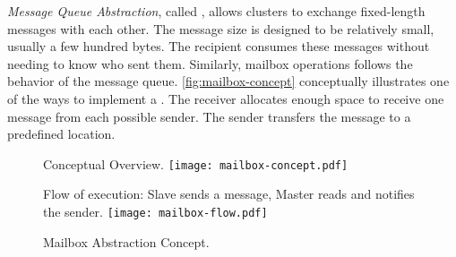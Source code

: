 
			\textit{Message Queue Abstraction}, called \mailbox, allows clusters to exchange
			fixed-length messages with each other. The message size is designed to be
			relatively small, usually a few hundred bytes. The recipient consumes these
			messages without needing to know who sent them. Similarly, mailbox operations
			follows the behavior of the \posix message queue. \autoref{fig:mailbox-concept}
			conceptually illustrates one of the ways to implement a \mailbox. The receiver
			allocates enough space to receive one message from each possible sender.
			The sender transfers the message to a predefined location.

			\begin{figure}[!tb]
				\centering%
				\caption{Mailbox Abstraction Concept.}%
				\label{fig:mailbox}%

					{Conceptual Overview.}%
					{\texttt{[image: mailbox-concept.pdf]}}%

				\hfill

					{Flow of execution: Slave sends a message, Master reads and notifies the sender.}%
					{\texttt{[image: mailbox-flow.pdf]}}%

			\end{figure}


